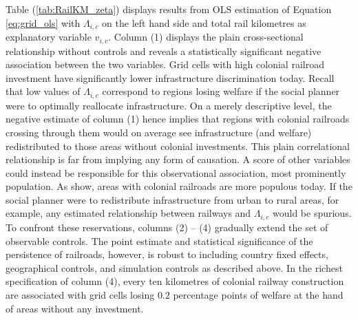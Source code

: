 \documentclass[11pt, oneside]{article}   	%
\let\oldref\ref
\renewcommand{\ref}[1]{(\oldref{#1})}
\begin{document}
Table \ref{tab:RailKM_zeta} displays results from OLS estimation of Equation \eqref{eq:grid_ols} with $\Lambda_{i,c}$ on the left hand side and total rail kilometres as explanatory variable $v_{i,c}$. Column (1) displays the plain cross-sectional relationship without controls and reveals a statistically significant negative association between the two variables. Grid cells with high colonial railroad investment have significantly lower infrastructure discrimination today. Recall that low values of $\Lambda_{i,c}$ correspond to regions losing welfare if the social planner were to optimally reallocate infrastructure. On a merely descriptive level, the negative estimate of column (1) hence implies that regions with colonial railroads crossing through them would on average see infrastructure (and welfare) redistributed to those areas without colonial investments. This plain correlational relationship is far from implying any form of causation. A score of other variables could instead be responsible for this observational association, most prominently population. As \citeauthor{jedwab_permanent_2016} show, areas with colonial railroads are more populous today. If the social planner were to redistribute infrastructure from urban to rural areas, for example, any estimated relationship between railways and $\Lambda_{i,c}$ would be spurious. To confront these reservations, columns (2) -- (4) gradually extend the set of observable controls. The point estimate and statistical significance of the persistence of railroads, however, is robust to including country fixed effects, geographical controls, and simulation controls as described above. In the richest specification of column (4), every ten kilometres of colonial railway construction are associated with grid cells losing $0.2$ percentage points of welfare at the hand of areas without any investment.
\end{document}
